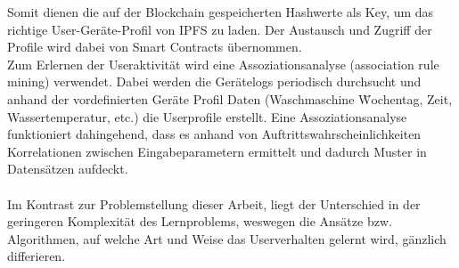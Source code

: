 Somit dienen die auf der Blockchain gespeicherten Hashwerte als Key, um das richtige User-Geräte-Profil von IPFS zu laden. Der Austausch und Zugriff der Profile wird dabei von Smart Contracts übernommen.\\
Zum Erlernen der Useraktivität wird eine Assoziationsanalyse (association rule mining) verwendet. Dabei werden die Gerätelogs periodisch durchsucht und anhand der vordefinierten Geräte Profil Daten (Waschmaschine \= Wochentag, Zeit, Wassertemperatur, etc.) die Userprofile erstellt. Eine Assoziationsanalyse funktioniert dahingehend, dass es anhand von Auftrittswahrscheinlichkeiten Korrelationen zwischen Eingabeparametern ermittelt und dadurch Muster in Datensätzen aufdeckt\cite{Cios2007, online:associationrules}.\\\\
Im Kontrast zur Problemstellung dieser Arbeit, liegt der Unterschied in der geringeren Komplexität des Lernproblems, weswegen die Ansätze bzw. Algorithmen, auf welche Art und Weise das Userverhalten gelernt wird, gänzlich differieren.